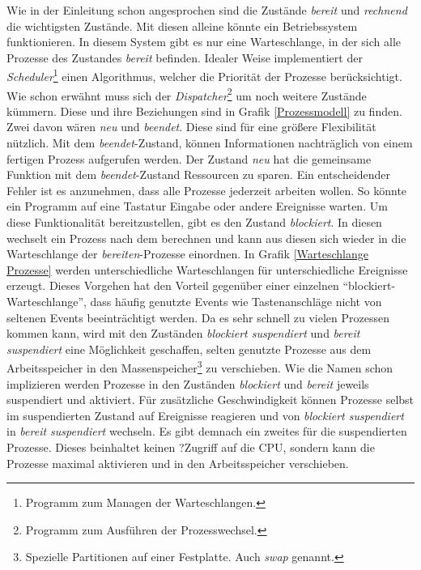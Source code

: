 \newpage
{}

Wie in der Einleitung schon angesprochen sind die Zustände \textit{bereit} und \textit{rechnend} die wichtigsten Zustände. Mit diesen alleine könnte ein Betriebssystem funktionieren. In diesem System gibt es nur eine Warteschlange, in der sich alle Prozesse des Zustandes \textit{bereit} befinden. Idealer Weise implementiert der \textit{Scheduler}\footnote{Programm zum Managen der Warteschlangen.} einen Algorithmus, welcher die Priorität der Prozesse berücksichtigt. Wie schon erwähnt muss sich der \textit{Dispatcher}\footnote{Programm zum Ausführen der Prozesswechsel.} um noch weitere Zustände kümmern. Diese und ihre Beziehungen sind in Grafik \ref{Prozessmodell} zu finden. Zwei davon wären \textit{neu} und \textit{beendet}. Diese sind für eine größere Flexibilität nützlich. Mit dem \textit{beendet}-Zustand, können Informationen nachträglich von einem fertigen Prozess aufgerufen werden. Der Zustand \textit{neu} hat die gemeinsame Funktion mit dem \textit{beendet}-Zustand Ressourcen zu sparen.\newline
Ein entscheidender Fehler ist es anzunehmen, dass alle Prozesse jederzeit arbeiten wollen. So könnte ein Programm auf eine Tastatur Eingabe oder andere Ereignisse warten. Um diese Funktionalität bereitzustellen, gibt es den Zustand \textit{blockiert}. In diesen wechselt ein Prozess nach dem berechnen und kann aus diesen sich wieder in die Warteschlange der \textit{bereiten}-Prozesse einordnen. In Grafik \ref{Warteschlange Prozesse} werden unterschiedliche Warteschlangen für unterschiedliche Ereignisse erzeugt. Dieses Vorgehen hat den Vorteil gegenüber einer einzelnen ``blockiert-Warteschlange'', dass häufig genutzte Events wie Tastenanschläge nicht von seltenen Events beeinträchtigt werden.\newline
Da es sehr schnell zu vielen Prozessen kommen kann, wird mit den Zuständen \textit{blockiert suspendiert} und \textit{bereit suspendiert} eine Möglichkeit geschaffen, selten genutzte Prozesse aus dem Arbeitsspeicher in den Massenspeicher\footnote{Spezielle Partitionen auf einer Festplatte. Auch \textit{swap} genannt.} zu verschieben. Wie die Namen schon implizieren werden Prozesse in den Zuständen \textit{blockiert} und \textit{bereit} jeweils suspendiert und aktiviert. Für zusätzliche Geschwindigkeit können Prozesse selbst im suspendierten Zustand auf Ereignisse reagieren und von \textit{blockiert suspendiert} in \textit{bereit suspendiert} wechseln. Es gibt demnach ein zweites  für die suspendierten Prozesse. Dieses beinhaltet keinen ?Zugriff auf die CPU, sondern kann die Prozesse maximal aktivieren und in den Arbeitsspeicher verschieben. \cite{BetriebssystemeKompakt}

